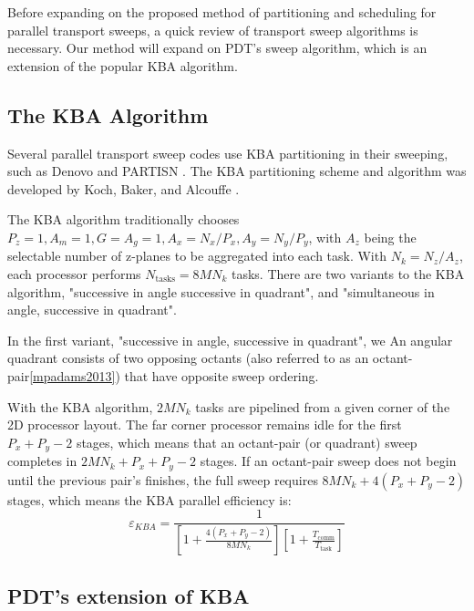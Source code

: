 \documentclass[11pt, letterpaper,titlepage,oneside]{article}
\begin{document}
Before expanding on the proposed method of partitioning and scheduling for parallel transport sweeps, a quick review of transport sweep algorithms is necessary. Our method will expand on PDT's sweep algorithm\cite{mpadams2013}, which is an extension of the popular KBA algorithm\cite{KBA}.

\subsection{The KBA Algorithm}

Several parallel transport sweep codes use KBA partitioning in their sweeping, such as Denovo \cite{denovo} and PARTISN \cite{partisn}. The KBA partitioning scheme and algorithm was developed by Koch, Baker, and Alcouffe \cite{partisn}.

The KBA algorithm traditionally chooses $P_z = 1, A_m = 1, G = A_g = 1, A_x = N_x/P_x, A_y = N_y/P_y$, with $A_z$ being the selectable number of z-planes to be aggregated into each task. With $N_k = N_z/A_z$, each processor performs $N_{\text{tasks}} = 8MN_k$ tasks. There are two variants to the KBA algorithm, "successive in angle successive in quadrant", and "simultaneous in angle, successive in quadrant". 

In the first variant, "successive in angle, successive in quadrant", we 
An angular quadrant consists of two opposing octants (also referred to as an octant-pair\ref{mpadams2013}) that have opposite sweep ordering. 


With the KBA algorithm, $2MN_k$ tasks are pipelined from a given corner of the 2D processor layout. The far corner processor remains idle for the first $P_x + P_y - 2 $ stages, which means that an octant-pair (or quadrant) sweep completes in $2MN_k + P_x + P_y - 2$ stages. If an octant-pair sweep does not begin until the previous pair's finishes, the full sweep requires $8MN_k + 4(P_x+P_y-2)$ stages, which means the KBA parallel efficiency is:
\begin{equation}
\varepsilon_{KBA} = \frac{1}{[1+\frac{4(P_x+P_y-2)}{8MN_k}][1+\frac{T_{\text{comm}}}{T_{\text{task}}}]}
\label{eKBA}
\end{equation}

\subsection{PDT's extension of KBA}

\end{document}
